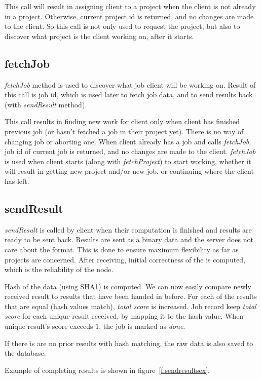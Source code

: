 This call will result in assigning client to a project when the client is not already in a project. Otherwise, current project id is returned, and no changes are made to the client. So this call is not only used to request the project, but also to discover what project is the client working on, after it starts.

\subsection{fetchJob}

\emph{fetchJob} method is used to discover what job client will be working on. Result of this call is job id, which is used later to fetch job data, and to send results back (with \emph{sendResult} method).

This call results in finding new work for client only when client has finished previous job (or hasn't fetched a job in their project yet). There is no way of changing job or aborting one. When client already has a job and calls \emph{fetchJob}, job id of current job is returned, and no changes are made to the client. \emph{fetchJob} is used when client starts (along with \emph{fetchProject}) to start working, whether it will result in getting new project and/or new job, or continuing where the client has left.

\subsection{sendResult}

\emph{sendResult} is called by client when their computation is finished and results are ready to be sent back. Results are sent as a binary data and the server does not care about the format. This is done to ensure maximum flexibility as far as projects are concerned. After receiving, initial correctness of the is computed, which is the reliability of the node. 

Hash of the data (using SHA1) is computed. We can now easily compare newly received result to results that have been handed in before. For each of the results that are equal (hash values match), \emph{total score} is increased. Job record keep \emph{total score} for each unique result received, by mapping it to the hash value. When unique result's score exceeds $1$, the job is marked as \emph{done}.

If there is are no prior results with hash matching, the raw data is also saved to the database.

Example of completing results is shown in figure~\ref{f:sendresultsex}.

